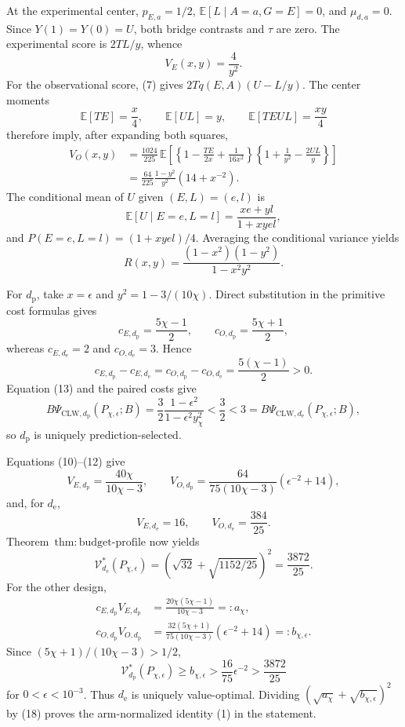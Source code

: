 At the experimental center, \(p_{E,a}=1/2\), \(\mathbb E[L\mid A=a,G=E]=0\), and \(\mu_{d,a}=0\). Since \(Y(1)=Y(0)=U\), both bridge contrasts and \(\tau\) are zero. The experimental score is \(2TL/y\), whence
\[
 V_E(x,y)=\frac4{y^2}.                                  \tag{10}
\]
For the observational score, (7) gives \(2Tq(E,A)(U-L/y)\). The center moments
\[
 \mathbb E[TE]=\frac{x}{4},\qquad
 \mathbb E[UL]=y,
 \qquad
 \mathbb E[TEUL]=\frac{xy}{4}                           \tag{11}
\]
therefore imply, after expanding both squares,
\[
\begin{aligned}
 V_O(x,y)
 &=\frac{1024}{225}\,
 \mathbb E\!\left[
 \left\{1-\frac{TE}{2x}+\frac1{16x^2}\right\}
 \left\{1+\frac1{y^2}-\frac{2UL}{y}\right\}
 \right]\\
 &=\frac{64}{225}\frac{1-y^2}{y^2}\left(14+x^{-2}\right). \tag{12}
\end{aligned}
\]
The conditional mean of \(U\) given \((E,L)=(e,l)\) is
\[
 \mathbb E[U\mid E=e,L=l]=\frac{xe+yl}{1+xyel},
\]
and \(P(E=e,L=l)=(1+xyel)/4\). Averaging the conditional variance yields
\[
 R(x,y)=\frac{(1-x^2)(1-y^2)}{1-x^2y^2}.               \tag{13}
\]

For \(d_{\mathrm p}\), take \(x=\epsilon\) and \(y^2=1-3/(10\chi)\). Direct substitution in the primitive cost formulas gives
\[
 c_{E,d_{\mathrm p}}=\frac{5\chi-1}{2},\qquad
 c_{O,d_{\mathrm p}}=\frac{5\chi+1}{2},
\]
whereas \(c_{E,d_{\mathrm e}}=2\) and \(c_{O,d_{\mathrm e}}=3\). Hence
\[
 c_{E,d_{\mathrm p}}-c_{E,d_{\mathrm e}}
 =c_{O,d_{\mathrm p}}-c_{O,d_{\mathrm e}}
 =\frac{5(\chi-1)}2>0.                                 \tag{14}
\]
Equation (13) and the paired costs give
\[
 B\Psi_{\mathrm{CLW},d_{\mathrm p}}(P_{\chi,\epsilon};B)
 =\frac32\frac{1-\epsilon^2}{1-\epsilon^2y_\chi^2}
 <\frac32<3
 =B\Psi_{\mathrm{CLW},d_{\mathrm e}}(P_{\chi,\epsilon};B), \tag{15}
\]
so \(d_{\mathrm p}\) is uniquely prediction-selected.

Equations (10)--(12) give
\[
 V_{E,d_{\mathrm p}}=\frac{40\chi}{10\chi-3},
 \qquad
 V_{O,d_{\mathrm p}}
 =\frac{64}{75(10\chi-3)}(\epsilon^{-2}+14),           \tag{16}
\]
and, for \(d_{\mathrm e}\),
\[
 V_{E,d_{\mathrm e}}=16,\qquad
 V_{O,d_{\mathrm e}}=\frac{384}{25}.                   \tag{17}
\]
Theorem~\(\mathrm{thm{:}budget\text{-}profile}\) now yields
\[
 \mathcal V_{d_{\mathrm e}}^*(P_{\chi,\epsilon})
 =\left(\sqrt{32}+\sqrt{1152/25}\right)^2
 =\frac{3872}{25}.                                     \tag{18}
\]
For the other design,
\[
\begin{aligned}
 c_{E,d_{\mathrm p}}V_{E,d_{\mathrm p}}
 &=\frac{20\chi(5\chi-1)}{10\chi-3}=:a_{\chi},\\
 c_{O,d_{\mathrm p}}V_{O,d_{\mathrm p}}
 &=\frac{32(5\chi+1)}{75(10\chi-3)}
   (\epsilon^{-2}+14)=:b_{\chi,\epsilon}.             \tag{19}
\end{aligned}
\]
Since \((5\chi+1)/(10\chi-3)>1/2\),
\[
 \mathcal V_{d_{\mathrm p}}^*(P_{\chi,\epsilon})
 \ge b_{\chi,\epsilon}
 >\frac{16}{75}\epsilon^{-2}
 >\frac{3872}{25}                                      \tag{20}
\]
for \(0<\epsilon<10^{-3}\). Thus \(d_{\mathrm e}\) is uniquely value-optimal. Dividing \((\sqrt{a_{\chi}}+\sqrt{b_{\chi,\epsilon}})^2\) by (18) proves the arm-normalized identity (1) in the statement.

